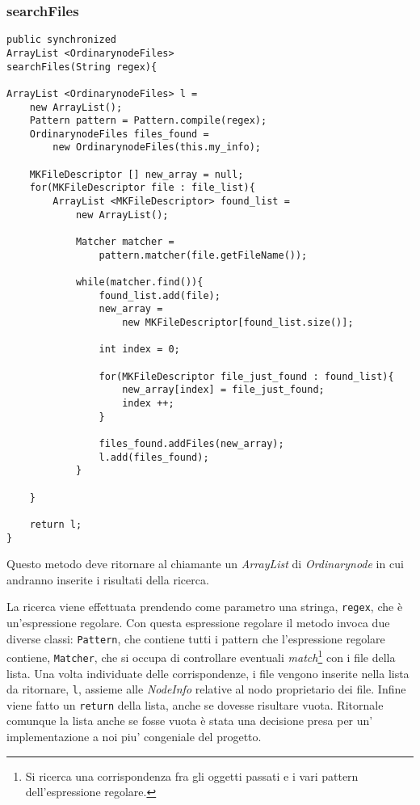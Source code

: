 \subsubsection{searchFiles}\label{sec:on_searchFiles}
\begin{lstlisting}
public synchronized 
ArrayList <OrdinarynodeFiles> 
searchFiles(String regex){

ArrayList <OrdinarynodeFiles> l = 
	new ArrayList();
	Pattern pattern = Pattern.compile(regex);
	OrdinarynodeFiles files_found = 
		new OrdinarynodeFiles(this.my_info);

	MKFileDescriptor [] new_array = null;
	for(MKFileDescriptor file : file_list){
		ArrayList <MKFileDescriptor> found_list = 
			new ArrayList();

			Matcher matcher = 
				pattern.matcher(file.getFileName());

			while(matcher.find()){
				found_list.add(file);
				new_array = 
					new MKFileDescriptor[found_list.size()];
				
				int index = 0;
				
				for(MKFileDescriptor file_just_found : found_list){
					new_array[index] = file_just_found;
					index ++;
				}
				
				files_found.addFiles(new_array);
				l.add(files_found);
			}

	}
	
	return l;
}
\end{lstlisting}
Questo metodo deve ritornare al chiamante un \emph{ArrayList} di \emph{Ordinarynode} in cui andranno inserite i risultati della ricerca.
 
La ricerca viene effettuata prendendo come parametro una stringa, \verb|regex|, che è un'espressione regolare.
Con questa espressione regolare il metodo invoca due diverse classi: \verb|Pattern|, che contiene tutti i pattern che l'espressione regolare contiene, \verb|Matcher|, che si occupa di controllare eventuali \emph{match}\footnote{Si ricerca una corrispondenza fra gli oggetti passati e i vari pattern dell'espressione regolare.} con i file della lista.
Una volta individuate delle corrispondenze, i file vengono inserite nella lista da ritornare, \verb|l|, assieme alle \emph{NodeInfo} relative al nodo proprietario dei file.
Infine viene fatto un \verb|return| della lista, anche se dovesse risultare vuota.
Ritornale comunque la lista anche se fosse vuota è stata una decisione presa per un' implementazione a noi piu' congeniale del progetto.

